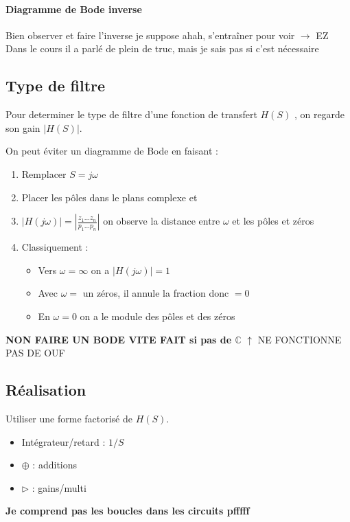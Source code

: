 \documentclass{article}
\theoremstyle{plain}%
\theoremstyle{definition}
\theoremstyle{remark}
\begin{document}
\paragraph*{Diagramme de Bode inverse}
Bien observer et faire l'inverse je suppose ahah, s'entraîner pour voir $\rightarrow$ EZ\\
Dans le cours il a parlé de plein de truc, mais je sais pas si c'est nécessaire

\subsection{Type de filtre}
Pour determiner le type de filtre d'une fonction de transfert $ H(S) $ , on regarde son gain $ \left| H(S) \right| $.

On peut éviter un diagramme de Bode en faisant : 
\begin{enumerate}
    \item Remplacer $ S=j \omega  $ 
    \item Placer les pôles dans le plans complexe et 
    \item $ \left| H(j \omega ) \right| = \left| \frac{z_1\dots z_n}{p_1 \dots p_n} \right|  $ on observe la distance entre $ \omega $ et les pôles et zéros
    \item Classiquement : \begin{itemize}
        \item Vers $ \omega = \infty  $ on a $ \left| H(j \omega ) \right| = 1 $ 
        \item Avec $ \omega =  $ un zéros, il annule la fraction donc $ = 0 $ 
        \item En $ \omega = 0 $ on a le module des pôles et des zéros
    \end{itemize}
\end{enumerate}

\textbf{NON FAIRE UN BODE VITE FAIT si pas de $ \mathbb{C} $ } $ \uparrow  $ NE FONCTIONNE PAS DE OUF 

\subsection{Réalisation}
Utiliser une forme factorisé de $ H(S) $. \begin{itemize}
    \item Intégrateur/retard : $ 1/S $ 
    \item $ \oplus $ : additions
    \item $ \rhd $ : gains/multi
\end{itemize}
\textbf{Je comprend pas les boucles dans les circuits pfffff}
\end{document}
